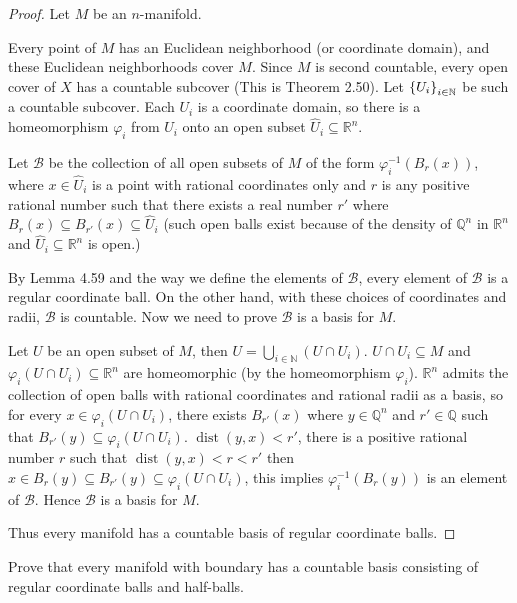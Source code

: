 \begin{proof}
	Let $M$ be an $n$-manifold.

	Every point of $M$ has an Euclidean neighborhood (or coordinate domain), and these Euclidean neighborhoods cover $M$. Since $M$ is second countable, every open cover of $X$ has a countable subcover (This is Theorem 2.50). Let $\left\{{U_{i}}\right\}_{i\in\mathbb{N}}$ be such a countable subcover. Each $U_{i}$ is a coordinate domain, so there is a homeomorphism $\varphi_{i}$ from $U_{i}$ onto an open subset $\widehat{U}_{i} \subseteq \mathbb{R}^{n}$.

	Let $\mathscr{B}$ be the collection of all open subsets of $M$ of the form $\varphi_{i}^{-1}(B_{r}(x))$, where $x\in \widehat{U}_{i}$ is a point with rational coordinates only and $r$ is any positive rational number such that there exists a real number $r'$ where $B_{r}(x) \subseteq B_{r'}(x) \subseteq \widehat{U}_{i}$ (such open balls exist because of the density of $\mathbb{Q}^{n}$ in $\mathbb{R}^{n}$ and $\widehat{U}_{i} \subseteq \mathbb{R}^{n}$ is open.)

	By Lemma 4.59 and the way we define the elements of $\mathscr{B}$, every element of $\mathscr{B}$ is a regular coordinate ball. On the other hand, with these choices of coordinates and radii, $\mathscr{B}$ is countable. Now we need to prove $\mathscr{B}$ is a basis for $M$.

	Let $U$ be an open subset of $M$, then $U = \bigcup_{i\in\mathbb{N}}(U\cap U_{i})$. $U\cap U_{i} \subseteq M$ and $\varphi_{i}(U\cap U_{i}) \subseteq \mathbb{R}^{n}$ are homeomorphic (by the homeomorphism $\varphi_{i}$). $\mathbb{R}^{n}$ admits the collection of open balls with rational coordinates and rational radii as a basis, so for every $x\in \varphi_{i}(U\cap U_{i})$, there exists $B_{r'}(x)$ where $y\in \mathbb{Q}^{n}$ and $r' \in \mathbb{Q}$ such that $B_{r'}(y) \subseteq \varphi_{i}(U\cap U_{i})$. $\operatorname{dist}(y, x) < r'$, there is a positive rational number $r$ such that $\operatorname{dist}(y, x) < r < r'$ then $x \in B_{r}(y) \subseteq B_{r'}(y) \subseteq \varphi_{i}(U\cap U_{i})$, this implies $\varphi_{i}^{-1}(B_{r}(y))$ is an element of $\mathscr{B}$. Hence $\mathscr{B}$ is a basis for $M$.

	Thus every manifold has a countable basis of regular coordinate balls.
\end{proof}

\begin{exercise}{4.62}
	Prove that every manifold with boundary has a countable basis consisting of regular coordinate balls and half-balls.
\end{exercise}

